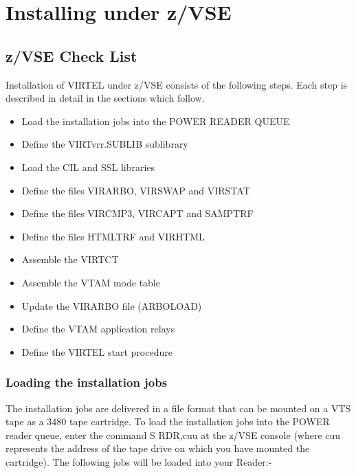 \documentclass[letterpaper,10pt,english]{sphinxmanual}
\begin{document}
\chapter{Installing under z/VSE}
\label{\detokenize{Installation_Guide:index-17}}\label{\detokenize{Installation_Guide:installing-under-z-vse}}

\section{z/VSE Check List}
\label{\detokenize{Installation_Guide:z-vse-check-list}}\label{\detokenize{Installation_Guide:index-18}}
Installation of VIRTEL under z/VSE consists of the following steps. Each step is described in detail in the sections which follow.
\begin{itemize}
\item {} 
Load the installation jobs into the POWER READER QUEUE

\item {} 
Define the VIRTvrr.SUBLIB sublibrary

\item {} 
Load the CIL and SSL libraries

\item {} 
Define the files VIRARBO, VIRSWAP and VIRSTAT

\item {} 
Define the files VIRCMP3, VIRCAPT and SAMPTRF

\item {} 
Define the files HTMLTRF and VIRHTML

\item {} 
Assemble the VIRTCT

\item {} 
Assemble the VTAM mode table

\item {} 
Update the VIRARBO file (ARBOLOAD)

\item {} 
Define the VTAM application relays

\item {} 
Define the VIRTEL start procedure

\end{itemize}


\subsection{Loading the installation jobs}
\label{\detokenize{Installation_Guide:loading-the-installation-jobs}}\label{\detokenize{Installation_Guide:index-19}}
The installation jobs are delivered in a file format that can be mounted on a VTS tape as a 3480 tape cartridge. To load the installation jobs into the POWER reader queue, enter the command S RDR,cuu at the z/VSE console (where cuu represents the address of the tape drive on which you have mounted the cartridge). The following jobs will be loaded into your Reader:-
\end{document}
